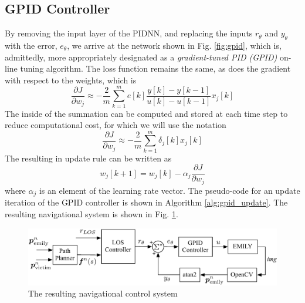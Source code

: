 \documentclass[conference]{IEEEtran}
\newcommand{\reference}{r_\theta}
\newcommand{\error}{e_\theta}
\newcommand{\measurement}{y_\theta}
\begin{document}
\subsection{GPID Controller} %
\label{sub:gpid_controller}
By removing the input layer of the PIDNN, and replacing the inputs $\reference$ and $\measurement$ with the error, $\error$, we arrive at the network shown in Fig. \ref{fig:gpid}, which is, admittedly, more appropriately designated as a \textit{gradient-tuned PID (GPID)} on-line tuning algorithm. The loss function remains the same, as does the gradient with respect to the weights, which is
\begin{equation}
  \frac{\partial J}{\partial w_j} \approx -\frac{2}{m} \sum\limits_{k=1}^m e[k] \frac{y[k] - y[k - 1]}{u[k] - u[k-1]} x_j[k]
\end{equation}
The inside of the summation can be computed and stored at each time step to reduce computational cost, for which we will use the notation
\begin{equation}\label{eq:gradient}
  \frac{\partial J}{\partial w_j} \approx -\frac{2}{m} \sum\limits_{k=1}^m \delta_j[k] x_j[k]
\end{equation}
The resulting in update rule can be written as
\begin{equation}
  w_j[k + 1] = w_j[k] - \alpha_j \frac{\partial J}{\partial w_j}
\end{equation}
where $\alpha_j$ is an element of the learning rate vector. The pseudo-code for an update iteration of the GPID controller is shown in Algorithm \ref{alg:gpid_update}. The resulting navigational system is shown in Fig. \ref{fig:sys}.

\begin{figure}[t]
  \centering
  \includegraphics[scale=0.6]{figs/system_overview.pdf}
  \caption{The resulting navigational control system}
  \label{fig:sys}
\end{figure}
\end{document}
